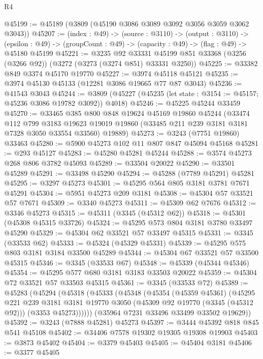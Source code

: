 \begin{lexlean}{R4}
\begin{coremodule}
@45199 := @45189 (@3809 (@45190 @3086 @3089 @3092 @3056 @3059 @3062 @3043))
@45207 := (index : @49) ->
  (source : @3110) ->
  (output : @3110) ->
  (epsilon : @49) -> (groupCount : @49) -> (capacity : @49) -> (flag : @49) -> @45180 @45199
@45221 := @3235
    @92
    @33331
    @45199
    @851
    @33368
    (@3256 (@3266 @92))
    (@3272 (@3273 (@3274 @851) @33331 @3250))
@45225 := @33382 @849 @3374 @45170 @19770
@45227 := @3974 @45118 @45121
@45235 := @3974 @45130 @45133 (@12281 @3086 @19665 @77 @87 @3043)
@45236 := @41543 @3043
@45244 := @3809 (@45227 (@45235 (let state : @3154 := @45157; @45236 @3086 @19782 @3092)) @4018)
@45246 := @45225 @45244 @33459
@45270 := @33465
    @385
    @800
    @848
    @19624
    @45169
    @19860
    @45244
    (@33474
      @112
      @799
      @3183
      @19623
      @19019
      @19860
      (@33485 @211 @239 @3181 @3181 @7328 @3050 @33554 @33560)
      @19889)
@45273 := @3243 (@7751 @19860) @33463
@45280 := @5900 @45273 @102 @11 @807 @847 @45094 @45168
@45281 := @293 @45127
@45283 := @45280 @45281 @45244
@45288 := @3574 @45273 @268 @806 @3782 @45093
@45289 := @33504 @20022
@45290 := @33501 @45289
@45291 := @33498 @45290
@45294 := @45288 (@7789 @45291) @45281
@45295 := @3297 @45273
@45301 := @45295 @564 @805 @3181 @3781 @7671 @45291
@45304 := @5951 @45273 @209 @3181
@45308 := @45304 @57 @33521 @57 @7671
@45309 := @3340 @45273
@45311 := @45309 @62 @7676
@45312 := @3346 @45273
@45315 := @45311 (@3345 (@45312 @62))
@45318 := @45301 (@45308 @45315 @33726)
@45324 := @45295 @573 @804 @3181 @3780 @33497 @45290
@45329 := @45304 @62 @33521 @57 @33497 @45315
@45331 := @3345 (@33533 @62)
@45333 := @45324 (@45329 @45331)
@45339 := @45295 @575 @803 @3181 @3184 @33500 @45289
@45344 := @45304 @67 @33521 @57 @33500 @45315
@45346 := @3345 (@33533 @67)
@45348 := @45339 (@45344 @45346)
@45354 := @45295 @577 @680 @3181 @3183 @33503 @20022
@45359 := @45304 @72 @33521 @57 @33503 @45315
@45361 := @3345 (@33533 @72)
@45389 := @45283
    (@45294
      (@45318
        (@45333
          (@45348
            (@45354
              (@45359 @45361)
              (@45295
                @221
                @239
                @3181
                @3181
                @19770
                @3050
                (@45309 @92 @19770 (@3345 (@45312 @92)))
                (@3353 @45273))))))
      (@35964 @7231 @33496 @33499 @33502 @19629))
@45392 := @3243 (@7888 @45281) @45273
@45397 := @3444 @45392 @818 @845 @541 @45108
@45402 := @34406 @7578 @19302 @19305 @19308 @19903
@45403 := @3873 @45402
@45404 := @3379 @45403
@45405 := @45404 @3181
@45406 := @3377 @45405

\end{coremodule}
\end{lexlean}
